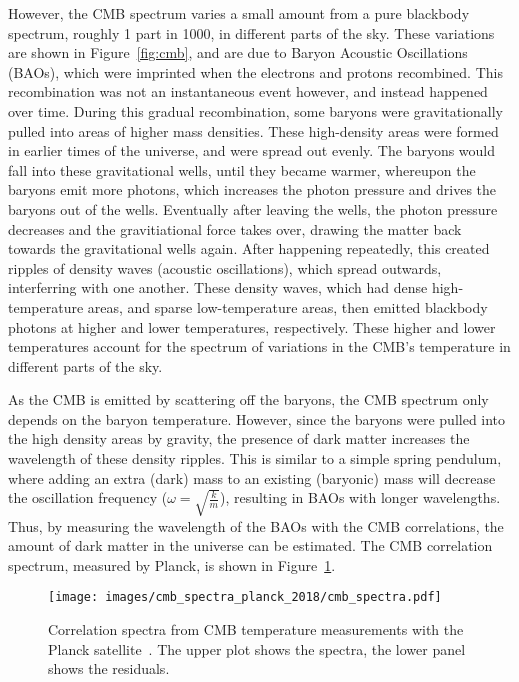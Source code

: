 However, the CMB spectrum varies a small amount from a pure blackbody spectrum, roughly 1 part in 1000, in different parts of the sky.
These variations are shown in Figure~\ref{fig:cmb}, and are due to Baryon Acoustic Oscillations (BAOs), which were imprinted when the electrons and protons recombined.
This recombination was not an instantaneous event however, and instead happened over time.
During this gradual recombination, some baryons were gravitationally pulled into areas of higher mass densities.
These high-density areas were formed in earlier times of the universe, and were spread out evenly.
The baryons would fall into these gravitational wells, until they became warmer, whereupon the baryons emit more photons, which increases the photon pressure and drives the baryons out of the wells.
Eventually after leaving the wells, the photon pressure decreases and the gravitiational force takes over, drawing the matter back towards the gravitational wells again.
After happening repeatedly, this created ripples of density waves (acoustic oscillations), which spread outwards, interferring with one another.
These density waves, which had dense high-temperature areas, and sparse low-temperature areas, then emitted blackbody photons at higher and lower temperatures, respectively.
These higher and lower temperatures account for the spectrum of variations in the CMB's temperature in different parts of the sky.

As the CMB is emitted by scattering off the baryons, the CMB spectrum only depends on the baryon temperature.
However, since the baryons were pulled into the high density areas by gravity, the presence of dark matter increases the wavelength of these density ripples.
This is similar to a simple spring pendulum, where adding an extra (dark) mass to an existing (baryonic) mass will decrease the oscillation frequency ($\omega = \sqrt{\frac{k}{m}}$), resulting in BAOs with longer wavelengths.
Thus, by measuring the wavelength of the BAOs with the CMB correlations, the amount of dark matter in the universe can be estimated.
The CMB correlation spectrum, measured by Planck, is shown in Figure~\ref{fig:cmb_correlation_spectra}.

\begin{figure}[t]
  \centering
  \texttt{[image: images/cmb\_spectra\_planck\_2018/cmb\_spectra.pdf]}
  \caption[Cosmic Micrwave Background Correlation Spectrum]{
    Correlation spectra from CMB temperature measurements with the Planck satellite~\cite{planck_dm_limit}.
    The upper plot shows the spectra, the lower panel shows the residuals.
  }
  \label{fig:cmb_correlation_spectra}
\end{figure}


